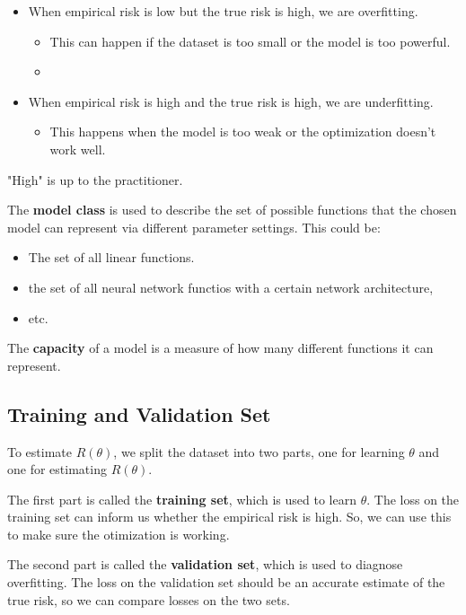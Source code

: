 \documentclass[11pt]{scrartcl}
\newcommand{\1}{\textbf{1}} %
\begin{document}
\begin{itemize}
\item When empirical risk is low but the true risk is high, we are overfitting.
\begin{itemize}
\item This can happen if the dataset is too small or the model is too powerful.
\item 
\end{itemize}
\item When empirical risk is high and the true risk is high, we are underfitting.
\begin{itemize}
\item This happens when the model is too weak or the optimization doesn't work well.
\end{itemize}
\end{itemize}
"High" is up to the practitioner.

The \textbf{model class} is used to describe the set of possible functions that the chosen model can represent via different parameter settings.  This could be:
\begin{itemize}
\item The set of all linear functions.
\item the set of all neural network functios with a certain network architecture,
\item etc.
\end{itemize}
The \textbf{capacity} of a model is a measure of how many different functions it can represent.

\subsection{Training and Validation Set}
To estimate $R(\theta)$, we split the dataset into two parts, one for learning $\theta$ and one for estimating $R(\theta)$.

The first part is called the \textbf{training set}, which is used to learn $\theta$.  The loss on the training set can inform us whether the empirical risk is high. So, we can use this to make sure the otimization is working.

The second part is called the \textbf{validation set}, which is used to diagnose overfitting.  The loss on the validation set should be an accurate estimate of the true risk, so we can compare losses on the two sets. 
\end{document}
